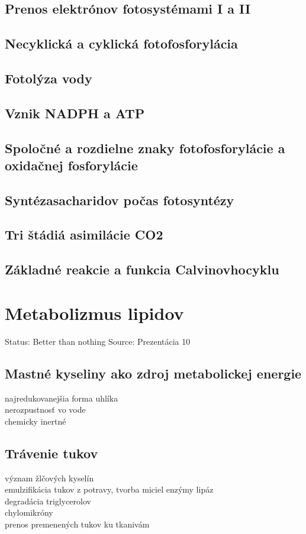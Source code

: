 \subsection*{Prenos elektrónov fotosystémami I a II}
\subsection*{Necyklická a cyklická fotofosforylácia}
\subsection*{Fotolýza vody}
\subsection*{Vznik NADPH a ATP}
\subsection*{Spoločné a rozdielne znaky fotofosforylácie a oxidačnej fosforylácie}
\subsection*{Syntézasacharidov počas fotosyntézy}
\subsection*{Tri štádiá asimilácie CO2}
\subsection*{Základné reakcie a funkcia Calvinovhocyklu}
\section{Metabolizmus lipidov}

Status: Better than nothing
Source: Prezentácia 10

\subsection*{Mastné kyseliny ako zdroj metabolickej energie}
najredukovanejšia forma uhlíka\\
nerozpustnosť vo vode\\
chemicky inertné\\
\subsection*{Trávenie tukov}
význam žlčových kyselín\\
\tab emulzifikácia tukov z potravy, tvorba miciel
enzýmy lipáz\\
\tab degradácia triglycerolov\\
chylomikróny\\
\tab prenos premenených tukov ku tkanivám\\
